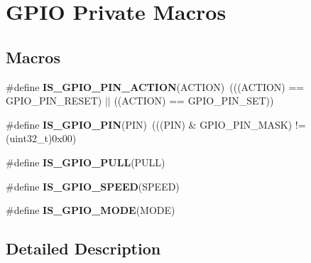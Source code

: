 \hypertarget{group___g_p_i_o___private___macros}{\section{G\-P\-I\-O Private Macros}
\label{group___g_p_i_o___private___macros}
}
\subsection*{Macros}
\begin{DoxyCompactItemize}
\item 
\hypertarget{group___g_p_i_o___private___macros_ga6da646a4924c5cfae3024c660476f26f}{\#define {\bfseries I\-S\-\_\-\-G\-P\-I\-O\-\_\-\-P\-I\-N\-\_\-\-A\-C\-T\-I\-O\-N}(A\-C\-T\-I\-O\-N)~(((A\-C\-T\-I\-O\-N) == G\-P\-I\-O\-\_\-\-P\-I\-N\-\_\-\-R\-E\-S\-E\-T) $\vert$$\vert$ ((A\-C\-T\-I\-O\-N) == G\-P\-I\-O\-\_\-\-P\-I\-N\-\_\-\-S\-E\-T))}\label{group___g_p_i_o___private___macros_ga6da646a4924c5cfae3024c660476f26f}

\item 
\hypertarget{group___g_p_i_o___private___macros_gad6ec74e33360395535ad5d91ba6d4781}{\#define {\bfseries I\-S\-\_\-\-G\-P\-I\-O\-\_\-\-P\-I\-N}(P\-I\-N)~(((P\-I\-N) \& G\-P\-I\-O\-\_\-\-P\-I\-N\-\_\-\-M\-A\-S\-K) != (uint32\-\_\-t)0x00)}\label{group___g_p_i_o___private___macros_gad6ec74e33360395535ad5d91ba6d4781}

\item 
\#define {\bfseries I\-S\-\_\-\-G\-P\-I\-O\-\_\-\-P\-U\-L\-L}(P\-U\-L\-L)
\item 
\#define {\bfseries I\-S\-\_\-\-G\-P\-I\-O\-\_\-\-S\-P\-E\-E\-D}(S\-P\-E\-E\-D)
\item 
\#define {\bfseries I\-S\-\_\-\-G\-P\-I\-O\-\_\-\-M\-O\-D\-E}(M\-O\-D\-E)
\end{DoxyCompactItemize}


\subsection{Detailed Description}


